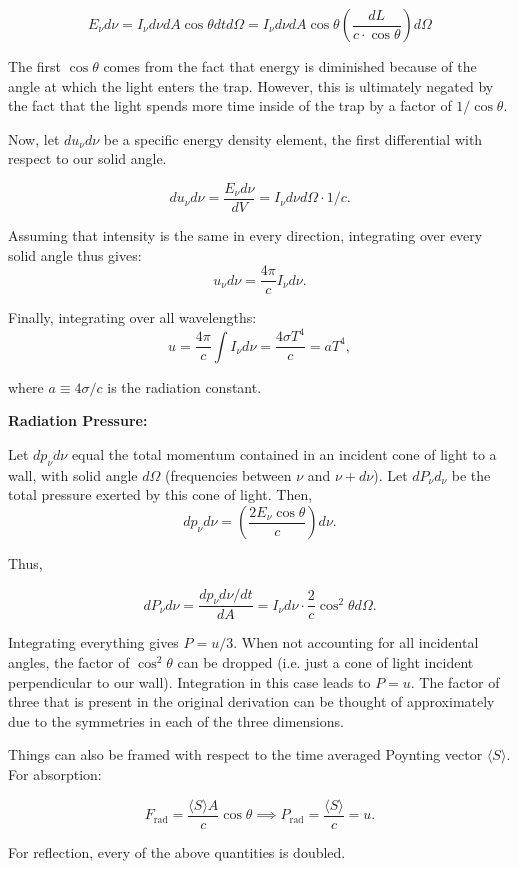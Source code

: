 \documentclass[12pt]{article}
\newcommand{\V}{

\vspace{\baselineskip}

}
\begin{document}
\[E_{\nu}d\nu = I_{\nu}d\nu dA\cos{\theta}dtd\Omega = I_{\nu}d\nu dA\cos{\theta}\left(\frac{dL}{c\cdot \cos{\theta}}\right)d\Omega\]

The first $\cos{\theta}$ comes from the fact that energy is diminished because of the angle at which the light enters the trap. However, this is ultimately negated by the fact that the light spends more time inside of the trap by a factor of $1/\cos{\theta}$. 

Now, let $du_{\nu}d\nu$ be a specific energy density element, the first differential with respect to our solid angle. 

\[du_{\nu}d\nu = \frac{E_{\nu}d\nu}{dV} = I_{\nu}d\nu d\Omega \cdot 1/c.\]

Assuming that intensity is the same in every direction, integrating over every solid angle thus gives: 
\[u_{\nu}d\nu = \frac{4\pi}{c}I_{\nu}d\nu.\]

Finally, integrating over all wavelengths: 
\[u = \frac{4\pi}{c}\int I_{\nu}d\nu = \frac{4\sigma T^4}{c} = aT^4,\]

where $a \equiv 4\sigma/c$ is the radiation constant.\V

\textbf{Radiation Pressure:}

Let $dp_{\nu}d\nu$ equal the total momentum contained in an incident cone of light to a wall, with solid angle $d\Omega$ (frequencies between $\nu$ and $\nu + d\nu$). Let $dP_{\nu}d_{\nu}$ be the total pressure exerted by this cone of light. Then, 
\[dp_{\nu}d\nu = \left(\frac{2E_{\nu}\cos{\theta}}{c}\right)d\nu.\]

Thus, 

\[dP_{\nu}d\nu = \frac{dp_{\nu}d\nu/dt}{dA} = I_{\nu}d\nu\cdot \frac{2}{c}\cos^2{\theta}d\Omega.\]

Integrating everything gives $P = u/3$. When not accounting for all incidental angles, the factor of $\cos^2{\theta}$ can be dropped (i.e. just a cone of light incident perpendicular to our wall). Integration in this case leads to $P = u$. The factor of three that is present in the original derivation can be thought of approximately due to the symmetries in each of the three dimensions.

Things can also be framed with respect to the time averaged Poynting vector $\langle S\rangle$. For absorption:

\[F_{\text{rad}} = \frac{\langle S\rangle A}{c}\cos{\theta} \implies P_{\text{rad}} = \frac{\langle S\rangle}{c} = u.\]

For reflection, every of the above quantities is doubled.
\end{document}
